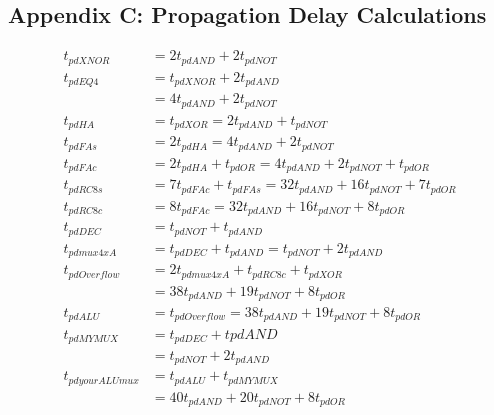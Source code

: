 \documentclass[12pt,letterpaper,titlepage]{article}
\begin{document}
\begin{raggedright}
\section{Appendix C: Propagation Delay Calculations}
\label{propdelay}
\begin{align*}
	t_{pdXNOR} &= 2t_{pdAND}+2t_{pdNOT} \\
	t_{pdEQ4} &= t_{pdXNOR}+2t_{pdAND} \\
			  &= 4t_{pdAND}+2t_{pdNOT}\\
	t_{pdHA} &= t_{pdXOR} = 2t_{pdAND}+t_{pdNOT} \\
	t_{pdFAs} &= 2t_{pdHA} = 4t_{pdAND}+2t_{pdNOT}  \\
	t_{pdFAc} &= 2t_{pdHA} + t_{pdOR} = 4t_{pdAND}+2t_{pdNOT} + t_{pdOR}  \\
	t_{pdRC8s} &= 7t_{pdFAc}+t_{pdFAs} = 32t_{pdAND}+16t_{pdNOT}+7t_{pdOR} \\
	t_{pdRC8c} &= 8t_{pdFAc} = 32t_{pdAND}+16t_{pdNOT} +8 t_{pdOR} \\
	t_{pdDEC} &= t_{pdNOT}+t_{pdAND} \\
	t_{pdmux4xA} &= t_{pdDEC}+t_{pdAND} = t_{pdNOT}+2t_{pdAND}\\
	t_{pdOverflow} &= 2t_{pdmux4xA}+ t_{pdRC8c}+t_{pdXOR}\\
			     &= 38t_{pdAND}+19t_{pdNOT} +8t_{pdOR}\\
	t_{pdALU} &= t_{pdOverflow} = 38t_{pdAND}+19t_{pdNOT} +8t_{pdOR}\\
	t_{pdMYMUX} &= t_{pdDEC} + t{pdAND} \\
	&= t_{pdNOT}+2t_{pdAND}\\
	t_{pdyourALUmux}&=t_{pdALU}+t_{pdMYMUX} \\
				&=40t_{pdAND}+20t_{pdNOT} +8t_{pdOR} 
\end{align*}
\clearpage



\end{raggedright}
\end{document}
